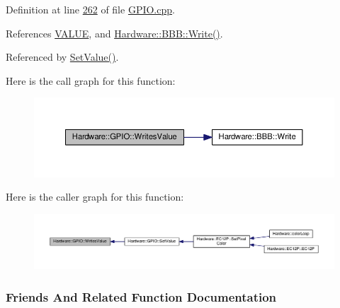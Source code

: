 Definition at line \hyperlink{_g_p_i_o_8cpp_source_l00262}{262} of file \hyperlink{_g_p_i_o_8cpp_source}{G\+P\+I\+O.\+cpp}.



References \hyperlink{_g_p_i_o_8h_source_l00019}{V\+A\+L\+U\+E}, and \hyperlink{_b_b_b_8cpp_source_l00042}{Hardware\+::\+B\+B\+B\+::\+Write()}.



Referenced by \hyperlink{_g_p_i_o_8cpp_source_l00075}{Set\+Value()}.



Here is the call graph for this function\+:
\nopagebreak
\begin{figure}[H]
\begin{center}
\leavevmode
\includegraphics[width=350pt]{class_hardware_1_1_g_p_i_o_a143da5d0e47450cd4080754d81026dc9_cgraph}
\end{center}
\end{figure}




Here is the caller graph for this function\+:
\nopagebreak
\begin{figure}[H]
\begin{center}
\leavevmode
\includegraphics[width=350pt]{class_hardware_1_1_g_p_i_o_a143da5d0e47450cd4080754d81026dc9_icgraph}
\end{center}
\end{figure}




\subsubsection{Friends And Related Function Documentation}
\hypertarget{class_hardware_1_1_g_p_i_o_aac791b3d71615b988c52d994896fdbec}{}

